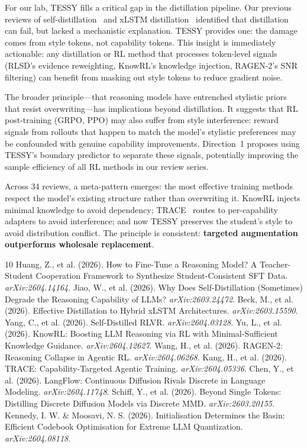 \documentclass[11pt]{article}
\begin{document}
For our lab, TESSY fills a critical gap in the distillation pipeline. Our previous reviews of self-distillation~\cite{selfdistill} and xLSTM distillation~\cite{xlstm} identified that distillation can fail, but lacked a mechanistic explanation. TESSY provides one: the damage comes from style tokens, not capability tokens. This insight is immediately actionable: any distillation or RL method that processes token-level signals (RLSD's evidence reweighting, KnowRL's knowledge injection, RAGEN-2's SNR filtering) can benefit from masking out style tokens to reduce gradient noise.

The broader principle---that reasoning models have entrenched stylistic priors that resist overwriting---has implications beyond distillation. It suggests that RL post-training (GRPO, PPO) may also suffer from style interference: reward signals from rollouts that happen to match the model's stylistic preferences may be confounded with genuine capability improvements. Direction~1 proposes using TESSY's boundary predictor to separate these signals, potentially improving the sample efficiency of all RL methods in our review series.

Across 34 reviews, a meta-pattern emerges: the most effective training methods respect the model's existing structure rather than overwriting it. KnowRL injects minimal knowledge to avoid dependency; TRACE~\cite{trace} routes to per-capability adapters to avoid interference; and now TESSY preserves the student's style to avoid distribution conflict. The principle is consistent: \textbf{targeted augmentation outperforms wholesale replacement}.

\begin{thebibliography}{10}
 Huang, Z., et al. (2026). How to Fine-Tune a Reasoning Model? A Teacher-Student Cooperation Framework to Synthesize Student-Consistent SFT Data. \textit{arXiv:2604.14164}.
 Jiao, W., et al. (2026). Why Does Self-Distillation (Sometimes) Degrade the Reasoning Capability of LLMs? \textit{arXiv:2603.24472}.
 Beck, M., et al. (2026). Effective Distillation to Hybrid xLSTM Architectures. \textit{arXiv:2603.15590}.
 Yang, C., et al. (2026). Self-Distilled RLVR. \textit{arXiv:2604.03128}.
 Yu, L., et al. (2026). KnowRL: Boosting LLM Reasoning via RL with Minimal-Sufficient Knowledge Guidance. \textit{arXiv:2604.12627}.
 Wang, H., et al. (2026). RAGEN-2: Reasoning Collapse in Agentic RL. \textit{arXiv:2604.06268}.
 Kang, H., et al. (2026). TRACE: Capability-Targeted Agentic Training. \textit{arXiv:2604.05336}.
 Chen, Y., et al. (2026). LangFlow: Continuous Diffusion Rivals Discrete in Language Modeling. \textit{arXiv:2604.11748}.
 Schiff, Y., et al. (2026). Beyond Single Tokens: Distilling Discrete Diffusion Models via Discrete MMD. \textit{arXiv:2603.20155}.
 Kennedy, I. W. \& Moosavi, N. S. (2026). Initialisation Determines the Basin: Efficient Codebook Optimisation for Extreme LLM Quantization. \textit{arXiv:2604.08118}.
\end{thebibliography}
\end{document}
